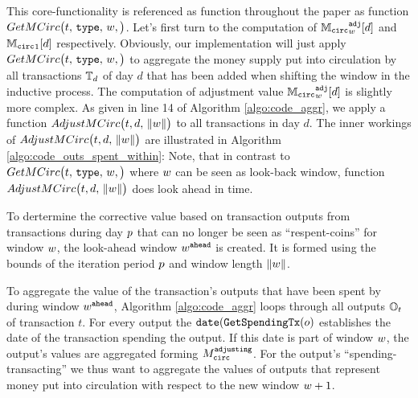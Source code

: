 This core-functionality is referenced as function throughout the paper as function \(GetMCirc\bigl(t,\,{\mathtt{type}},\,{w},\bigr)\). %
Let's first turn to the computation of \({{\mathbb{M}_{\mathtt{circ}}}^{\mathtt{adj}}_{{w}}}[d]\) and \({\mathbb{M}_{\mathtt{circ}}}_{1}[d]\) respectively. %
Obviously, our implementation will just apply \(GetMCirc\bigl(t,\,{\mathtt{type}},\,{w},\bigr)\) to aggregate the money supply put into circulation by all transactions \({{\mathbb{T}}_{d}}\) of day \(d\) that has been added when shifting the window in the inductive process. %
The computation of adjustment value \({{\mathbb{M}_{\mathtt{circ}}}^{\mathtt{adj}}_{{w}}}[d]\) is slightly more complex. %
As given in line 14 of Algorithm \ref{algo:code_aggr}, we apply a function \(AdjustMCirc\bigl(t, d,\,{\lVert w \rVert}\bigr)\) to all transactions in day \(d\). %
The inner workings of \(AdjustMCirc\bigl(t, d,\,{\lVert w \rVert}\bigr)\) are illustrated in Algorithm \ref{algo:code_outs_spent_within}: %
Note, that in contrast to \(GetMCirc\bigl(t,\,{\mathtt{type}},\,{w},\bigr)\) where \({w}\) can be seen as look-back window, function \(AdjustMCirc\bigl(t, d,\,{\lVert w \rVert}\bigr)\) does look ahead in time. %

To dertermine the corrective value based on transaction outputs from transactions during day \({p}\) that can no longer be seen as ``respent-coins'' for window \({w}\), the look-ahead window \({w}^{\mathtt{ahead}}\) is created. %
It is formed using the bounds of the iteration period \({p}\) and window length \({\lVert w \rVert}\). %

To aggregate the value of the transaction's outputs that have been spent by during window \({w}^{\mathtt{ahead}}\), Algorithm \ref{algo:code_aggr} loops through all outputs \({\mathbb{O}}_{t}\) of transaction \(t\). %
For every output the \(\mathtt{date}({\mathtt{GetSpendingTx}}(o)\) establishes the date of the transaction spending the output. %
If this date is part of window \({w}\), the output's values are aggregated forming \({M_{\mathtt{circ}}^{\mathtt{adjusting}}}\). %
For the output's ``spending-transacting'' we thus want to aggregate the values of outputs that represent money put into circulation with respect to the new window \({w} + 1\). %



